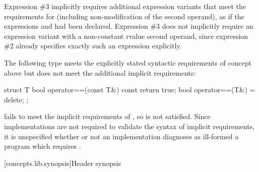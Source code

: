 Expression \#3 implicitly requires additional expression variants that meet the
requirements for  (including non-modification of the second operand),
as if the expressions  and  had been declared.
Expression \#3 does not implicitly require an expression variant with a
non-constant rvalue second operand, since expression \#2 already specifies exactly
such an expression explicitly.
\exitexample

\enterexample
The following type  meets the explicitly stated syntactic requirements
of concept  above but does not meet the additional implicit requirements:

\begin{codeblock}
struct T {
  bool operator==(const T&) const { return true; }
  bool operator==(T&) = delete;
};
\end{codeblock}

 fails to meet the implicit
requirements of , so  is not satisfied. Since
implementations are not required to validate the syntax of implicit requirements, it
is unspecified whether or not an implementation diagnoses as ill-formed a program
which requires .
\exitexample

[concepts.lib.synopsis]{Header  synopsis}

